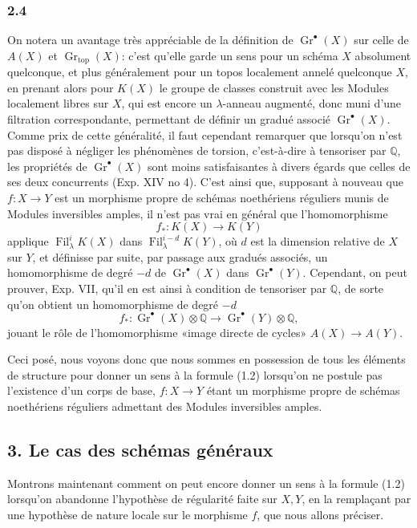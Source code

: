 \documentclass[11pt]{article}
\newcommand{\Gr}{\operatorname{Gr}}
\newcommand{\Fil}{\operatorname{Fil}}
\providecommand{\Gr}{\operatorname{Gr}}
\providecommand{\Gr}{\operatorname{G}}
\begin{document}
\subsubsection*{2.4}
On notera un avantage très appréciable de la définition de $\Gr^\bullet(X)$ sur celle de $A(X)$ et $\Gr_{\mathrm{top}}(X)$: c'est qu'elle garde un sens pour un schéma $X$ absolument quelconque, et plus généralement pour un topos localement annelé quelconque $X$, en prenant alors pour $K(X)$ le groupe de classes construit avec les Modules localement libres sur $X$, qui est encore un $\lambda$-anneau augmenté, donc muni d'une filtration correspondante, permettant de définir un gradué associé $\Gr^\bullet(X)$. Comme prix de cette généralité, il faut cependant remarquer que lorsqu'on n'est pas disposé à négliger les phénomènes de torsion, c'est-à-dire à tensoriser par $\mathbb Q$, les propriétés de $\Gr^\bullet(X)$ sont moins satisfaisantes à divers égards que celles de ses deux concurrents (Exp. XIV no 4). C'est ainsi que, supposant à nouveau que $f:X\to Y$ est un morphisme propre de schémas noethériens réguliers munis de Modules inversibles amples, il n'est pas vrai en général que l'homomorphisme
\[
f_*:K(X)\longrightarrow K(Y)
\]
applique $\Fil^i_\lambda K(X)$ dans $\Fil^{i-d}_\lambda K(Y)$, où $d$ est la dimension relative de $X$ sur $Y$, et définisse par suite, par passage aux gradués associés, un homomorphisme de degré $-d$ de $\Gr^\bullet(X)$ dans $\Gr^\bullet(Y)$. Cependant, on peut prouver, Exp. VII, qu'il en est ainsi à condition de tensoriser par $\mathbb Q$, de sorte qu'on obtient un homomorphisme de degré $-d$
\begin{equation}\tag{2.5}
f_*:\Gr^\bullet(X)\otimes\mathbb Q\longrightarrow \Gr^\bullet(Y)\otimes\mathbb Q,
\end{equation}
jouant le rôle de l'homomorphisme «image directe de cycles» $A(X)\to A(Y)$.

Ceci posé, nous voyons donc que nous sommes en possession de tous les éléments de structure pour donner un sens à la formule (1.2) lorsqu'on ne postule pas l'existence d'un corps de base, $f:X\to Y$ étant un morphisme propre de schémas noethériens réguliers admettant des Modules inversibles amples.

\subsection*{3. Le cas des schémas généraux}
Montrons maintenant comment on peut encore donner un sens à la formule (1.2) lorsqu'on abandonne l'hypothèse de régularité faite sur $X,Y$, en la remplaçant par une hypothèse de nature locale sur le morphisme $f$, que nous allons préciser.
\end{document}
